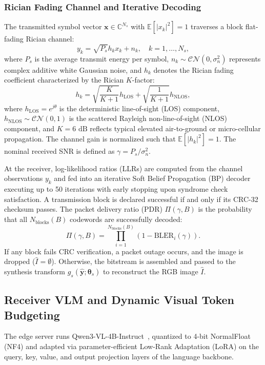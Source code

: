 \subsubsection{Rician Fading Channel and Iterative Decoding}
The transmitted symbol vector $\mathbf{x} \in \mathbb{C}^{N_s}$ with $\mathbb{E}[|x_k|^2] = 1$ traverses a block flat-fading Rician channel:
\begin{equation}\label{eq:channel_model}
y_k = \sqrt{P_s} h_k x_k + n_k, \quad k = 1, \dots, N_s,
\end{equation}
where $P_s$ is the average transmit energy per symbol, $n_k \sim \mathcal{CN}(0, \sigma_n^2)$ represents complex additive white Gaussian noise, and $h_k$ denotes the Rician fading coefficient characterized by the Rician $K$-factor:
\begin{equation}
h_k = \sqrt{\frac{K}{K+1}} h_{\mathrm{LOS}} + \sqrt{\frac{1}{K+1}} h_{\mathrm{NLOS}},
\end{equation}
where $h_{\mathrm{LOS}} = e^{j\theta}$ is the deterministic line-of-sight (LOS) component, $h_{\mathrm{NLOS}} \sim \mathcal{CN}(0, 1)$ is the scattered Rayleigh non-line-of-sight (NLOS) component, and $K = 6\text{ dB}$ reflects typical elevated air-to-ground or micro-cellular propagation. The channel gain is normalized such that $\mathbb{E}[|h_k|^2] = 1$. The nominal received SNR is defined as $\gamma = P_s / \sigma_n^2$.

At the receiver, log-likelihood ratios (LLRs) are computed from the channel observations $y_k$ and fed into an iterative Soft Belief Propagation (BP) decoder executing up to 50 iterations with early stopping upon syndrome check satisfaction. A transmission block is declared successful if and only if its CRC-32 checksum passes. The packet delivery ratio (PDR) $\Pi(\gamma, B)$ is the probability that all $N_{\mathrm{blocks}}(B)$ codewords are successfully decoded:
\begin{equation}
\Pi(\gamma, B) = \prod_{i=1}^{N_{\mathrm{blocks}}(B)} \left(1 - \mathrm{BLER}_i(\gamma)\right).
\end{equation}
If any block fails CRC verification, a packet outage occurs, and the image is dropped ($\hat{I} = \emptyset$). Otherwise, the bitstream is assembled and passed to the synthesis transform $g_s(\mathbf{\hat y}; \boldsymbol{\theta}_s)$ to reconstruct the RGB image $\hat{I}$.

\subsection{Receiver VLM and Dynamic Visual Token Budgeting}
The edge server runs Qwen3-VL-4B-Instruct~\cite{wang2024qwen2vl,bai2025qwen25vl}, quantized to 4-bit NormalFloat (NF4) and adapted via parameter-efficient Low-Rank Adaptation (LoRA) on the query, key, value, and output projection layers of the language backbone.

